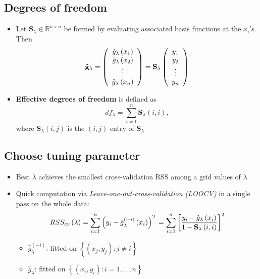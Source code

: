 \documentclass[]{article}
\providecommand{\tightlist}{%
  \setlength{\itemsep}{0pt}\setlength{\parskip}{0pt}}
\begin{document}
\subsection{Degrees of freedom}\label{degrees-of-freedom-1}

\begin{itemize}
\item
  Let \(\mathbf{S}_{\lambda}\in\mathbb{R}^{n\times n}\) be formed by
  evaluating associated basis functions at the \(x_{i}\)'s. Then \[
  \mathbf{\hat{g}}_{\lambda}=\left(
  \begin{array}
  [c]{c}%
  \hat{g}_{\lambda}\left(  x_{1}\right)  \\
  \hat{g}_{\lambda}\left(  x_{2}\right)  \\
  \vdots\\
  \hat{g}_{\lambda}\left(  x_{n}\right)
  \end{array}
  \right)  =\mathbf{S}_{\lambda}\left(
  \begin{array}
  [c]{c}%
  y_{1}\\
  y_{2}\\
  \vdots\\
  y_{n}%
  \end{array}
  \right)
  \]
\item
  \textbf{Effective degrees of freedom} is defined as \[
  df_{\lambda}=\sum_{i=1}^{n}\mathbf{S}_{\lambda}\left(  i,i\right)  ,
  \] where \(\mathbf{S}_{\lambda}\left( i,j\right)\) is the
  \(\left( i,j\right)\) entry of \(\mathbf{S}_{\lambda}\)
\end{itemize}

\subsection{Choose tuning parameter}\label{choose-tuning-parameter}

\begin{itemize}
\item
  Best \(\lambda\) achieves the smallest cross-validation RSS among a
  grid values of \(\lambda\)
\item
  Quick computation via \emph{Leave-one-out-cross-validation (LOOCV)} in
  a single pass on the whole data: \[
  RSS_{cv}\left(  \lambda\right)  =\sum_{i=1}^{n}\left(  y_{i}-\hat{g}_{\lambda
  }^{\left(  -i\right)  }\left(  x_{i}\right)  \right)  ^{2}\\=\sum_{i=1}
  ^{n}\left[  \frac{y_{i}-\hat{g}_{\lambda}\left(  x_{i}\right)  }
  {1-\mathbf{S}_{\lambda}\left(  i,i\right)  }\right]  ^{2}
  \]

  \begin{itemize}
  \tightlist
  \item
    \(\hat{g}_{\lambda}^{\left( -i\right) }\): fitted on
    \(\left\{ \left( x_{j},y_{j}\right) :j\neq i\right\}\)
  \item
    \(\hat{g}_{\lambda}\): fitted on
    \(\left\{ \left( x_{i},y_{i}\right) :i=1,...,n\right\}\)
  \end{itemize}
\end{itemize}
\end{document}
